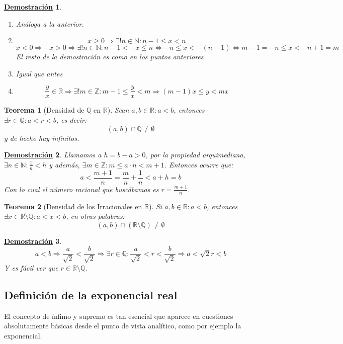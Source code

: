 \documentclass[10pt,a4paper,openright]{book}
\theoremstyle{break}
\newtheorem{theo}{Teorema}[chapter]
\newtheorem*{demo}{\underline{Demostración}}
\begin{document}
\begin{demo}
\begin{enumerate}
Por último hay que ver que son disjuntos dos a dos:
$$n,m\in \mathbb N: n\neq m\Rightarrow n<m\Rightarrow n+1\leq m\Rightarrow n\leq m-1\Rightarrow [n-1,n)\cap [m-1,m)\neq \emptyset$$
Esto es así porque $x\in [n-1,n)\Rightarrow x<n$ y $x\in [m-1,m)\Rightarrow x\geq m+1$, todo implica que $m-1<n$ \#
\item Análoga a la anterior.
\item $$x\geq 0\Rightarrow \exists! n \in \mathbb N : n-1\leq x<n$$
$$x<0\Rightarrow -x>0 \Rightarrow \exists! n \in \mathbb N: n-1<-x\leq n\Leftrightarrow -n\leq x< -(n-1)\Leftrightarrow m-1=-n\leq x< -n+1=m$$
El resto de la demostración es como en los puntos anteriores
\item Igual que antes
\item $$\frac{y}{x}\in \mathbb R\Rightarrow \exists! m \in \mathbb Z: m-1\leq \frac{y}{x}< m\Rightarrow (m-1)x\leq y< mx$$
\end{enumerate}
\end{demo}

\begin{theo}[Densidad de $\mathbb Q$ en $\mathbb R$]
Sean $a,b\in \mathbb R: a<b$, entonces $\exists r\in \mathbb Q: a<r<b$, es decir:
$$(a,b)\cap \mathbb Q\neq \emptyset$$
y de hecho hay infinitos.
\end{theo}
\begin{demo}
Llamamos a $h=b-a>0$, por la propiedad arquimediana, $\exists n \in \mathbb N: \frac{1}{n}<h$ y además, $\exists m \in \mathbb Z: m\leq a\cdot n< m+1$. Entonces ocurre que:
$$a<\frac{m+1}{n}=\frac{m}{n}+\frac{1}{n}< a+ h=b$$
Con lo cual el número racional que buscábamos es $r=\frac{m+1}{n}$.
\end{demo}

\begin{theo}[Densidad de los Irracionales en $\mathbb R$]
Si $a,b\in \mathbb R: a<b$, entonces $\exists x\in \mathbb R\mbox{\textbackslash} \mathbb Q: a<x<b$, en otras palabras:
$$(a,b)\cap (\mathbb R\mbox{\textbackslash} \mathbb Q)\neq \emptyset$$
\end{theo}
\begin{demo}
$$a<b\Rightarrow \frac{a}{\sqrt{2}}< \frac{b}{\sqrt{2}}\Rightarrow \exists r \in \mathbb Q: \frac{a}{\sqrt{2}}<r<\frac{b}{\sqrt{2}}\Rightarrow a <\sqrt{2}r<b$$
Y es fácil ver que $r\in \mathbb R\mbox{\textbackslash}\mathbb Q$.
\end{demo}

\subsection{Definición de la exponencial real}
El concepto de ínfimo y supremo es tan esencial que aparece en cuestiones absolutamente básicas desde el punto de vista analítico, como por ejemplo la exponencial.
\end{document}
